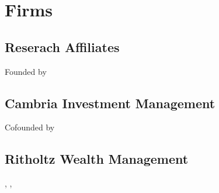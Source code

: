 \documentclass[letterpaper,10pt,english]{jupyterBook}
\begin{document}
\section{Firms}
\label{\detokenize{ch/people/list:firms}}\label{\detokenize{ch/people/list:fin-edu-resources-firms}}

\subsection{Reserach Affiliates}
\label{\detokenize{ch/people/list:reserach-affiliates}}\label{\detokenize{ch/people/list:fin-edu-resources-firms-research-affiliates}}
\sphinxAtStartPar
Founded by {\hyperref[\detokenize{ch/people/list:fin-edu-resources-people-arnott}]{}}


\subsection{Cambria Investment Management}
\label{\detokenize{ch/people/list:cambria-investment-management}}\label{\detokenize{ch/people/list:fin-edu-resources-firms-cambria}}
\sphinxAtStartPar
Co\sphinxhyphen{}founded by {\hyperref[\detokenize{ch/people/list:fin-edu-resources-people-faber}]{}}


\subsection{Ritholtz Wealth Management}
\label{\detokenize{ch/people/list:ritholtz-wealth-management}}\label{\detokenize{ch/people/list:fin-edu-resources-firms-ritholtz}}
\sphinxAtStartPar
{\hyperref[\detokenize{ch/people/list:fin-edu-resources-people-ritholtz}]{}}, {\hyperref[\detokenize{ch/people/list:fin-edu-resources-people-maggiulli}]{}}, {\hyperref[\detokenize{ch/people/list:fin-edu-resources-people-carlson}]{}}

\sphinxstepscope
\end{document}
